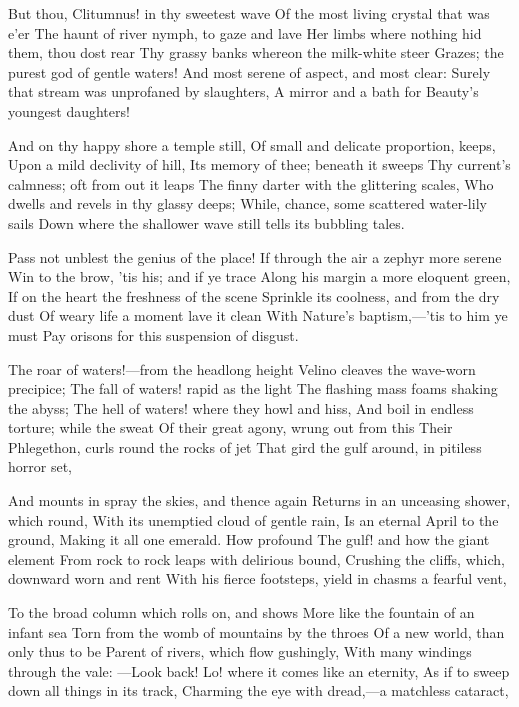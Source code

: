 \documentclass[10pt,twocolumn]{book}
\begin{document}
   But thou, Clitumnus! in thy sweetest wave
   Of the most living crystal that was e'er
   The haunt of river nymph, to gaze and lave
   Her limbs where nothing hid them, thou dost rear
   Thy grassy banks whereon the milk-white steer
   Grazes; the purest god of gentle waters!
   And most serene of aspect, and most clear:
   Surely that stream was unprofaned by slaughters,
A mirror and a bath for Beauty's youngest daughters!


   And on thy happy shore a temple still,
   Of small and delicate proportion, keeps,
   Upon a mild declivity of hill,
   Its memory of thee; beneath it sweeps
   Thy current's calmness; oft from out it leaps
   The finny darter with the glittering scales,
   Who dwells and revels in thy glassy deeps;
   While, chance, some scattered water-lily sails
Down where the shallower wave still tells its bubbling tales.


   Pass not unblest the genius of the place!
   If through the air a zephyr more serene
   Win to the brow, 'tis his; and if ye trace
   Along his margin a more eloquent green,
   If on the heart the freshness of the scene
   Sprinkle its coolness, and from the dry dust
   Of weary life a moment lave it clean
   With Nature's baptism,---'tis to him ye must
Pay orisons for this suspension of disgust.


   The roar of waters!---from the headlong height
   Velino cleaves the wave-worn precipice;
   The fall of waters! rapid as the light
   The flashing mass foams shaking the abyss;
   The hell of waters! where they howl and hiss,
   And boil in endless torture; while the sweat
   Of their great agony, wrung out from this
   Their Phlegethon, curls round the rocks of jet
That gird the gulf around, in pitiless horror set,


   And mounts in spray the skies, and thence again
   Returns in an unceasing shower, which round,
   With its unemptied cloud of gentle rain,
   Is an eternal April to the ground,
   Making it all one emerald.  How profound
   The gulf! and how the giant element
   From rock to rock leaps with delirious bound,
   Crushing the cliffs, which, downward worn and rent
With his fierce footsteps, yield in chasms a fearful vent,


   To the broad column which rolls on, and shows
   More like the fountain of an infant sea
   Torn from the womb of mountains by the throes
   Of a new world, than only thus to be
   Parent of rivers, which flow gushingly,
   With many windings through the vale: ---Look back!
   Lo! where it comes like an eternity,
   As if to sweep down all things in its track,
Charming the eye with dread,---a matchless cataract,
\end{document}
